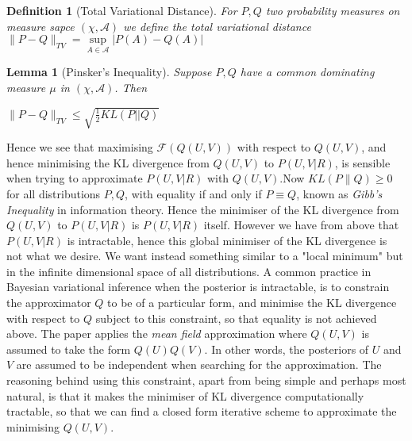 \documentclass{article}
\theoremstyle{plain}
\newtheorem*{lemma*}{Lemma}
\newtheorem*{def*}{Definition}
\begin{document}
\begin{def*}[Total Variational Distance] 
For $P,Q$ two probability measures on measure sapce $(\chi,\mathcal{A})$ we define the \textit{total variational distance} $\|P-Q\|_{TV}=\sup\limits_{A\in\mathcal{A}}|P(A)-Q(A)|$
\end{def*}

\begin{lemma*}[Pinsker's Inequality]
Suppose $P,Q$ have a common dominating measure $\mu$ in $(\chi,\mathcal{A})$. Then
\begin{center}
$\|P-Q\|_{TV} \leq \sqrt{\frac{1}{2}KL(P||Q)}$
\end{center}
\end{lemma*}

Hence we see that maximising $\mathcal{F}(Q(U,V))$ with respect to $Q(U,V)$, and hence minimising the KL divergence from $Q(U,V)$ to $P(U,V|R)$, is sensible when trying to approximate $P(U,V|R)$ with $Q(U,V)$.Now $KL(P\|Q) \geq 0$ for all distributions $P,Q$, with equality if and only if $P \equiv Q$, known as \textit{Gibb's Inequality} in information theory. Hence the minimiser of the KL divergence from $Q(U,V)$ to $P(U,V|R)$ is $P(U,V|R)$ itself. However we have from above that $P(U,V|R)$ is intractable, hence this global minimiser of the KL divergence is not what we desire. We want instead something similar to a "local minimum" but in the infinite dimensional space of all distributions. A common practice in Bayesian variational inference when the posterior is intractable, is to constrain the approximator $Q$ to be of a particular form, and minimise the KL divergence with respect to $Q$ subject to this constraint, so that equality is not achieved above. The paper applies the \textit{mean field} approximation where $Q(U,V)$ is assumed to take the form $Q(U)Q(V)$. In other words, the posteriors of $U$ and $V$ are assumed to be independent when searching for the approximation. The reasoning behind using this constraint, apart from being simple and perhaps most natural, is that it makes the minimiser of KL divergence computationally tractable, so that we can find a closed form iterative scheme to approximate the minimising $Q(U,V)$. 
\end{document}
